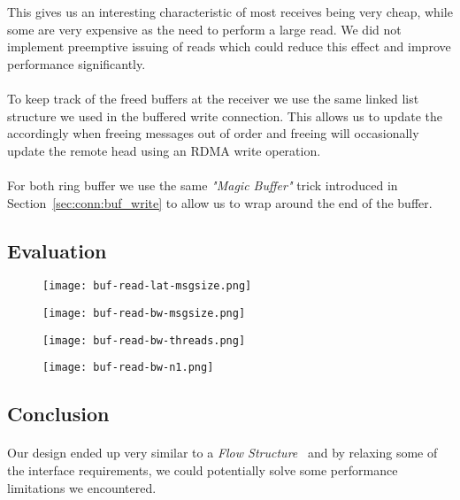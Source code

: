 This gives us an interesting characteristic of most receives being very cheap, while some are very expensive as the need to 
perform a large read. We did not implement preemptive issuing of reads which could reduce this effect and improve performance
significantly.

\paragraph{} To keep track of the freed buffers at the receiver we use the same linked list structure we used in the buffered
write connection. This allows us to update the  accordingly when freeing messages out of order and freeing will
occasionally update the remote head using an RDMA write operation.

\paragraph{} For both ring buffer we use the same \emph{"Magic Buffer"} trick introduced in Section~\ref{sec:conn:buf_write} to 
allow us to wrap around the end of the buffer.

\subsection{Evaluation}



\begin{figure}[htp]
\texttt{[image: buf-read-lat-msgsize.png]}
\label{fig:plot-bufread-lat}
\end{figure}


\begin{figure}[htp]
\texttt{[image: buf-read-bw-msgsize.png]}
\label{fig:plot-bufread-bw}
\end{figure}



\begin{figure}[htp]
\texttt{[image: buf-read-bw-threads.png]}
\label{fig:plot-bufread-bw-threads}
\end{figure}


\begin{figure}[htp]
\texttt{[image: buf-read-bw-n1.png]}
\label{fig:plot-bufread-bw-n1}
\end{figure}


\subsection{Conclusion}

\paragraph{} Our design ended up very similar to a \emph{Flow Structure}~\cite{sharma2020design} and by relaxing some of the
interface requirements, we could potentially solve some performance limitations we encountered.
